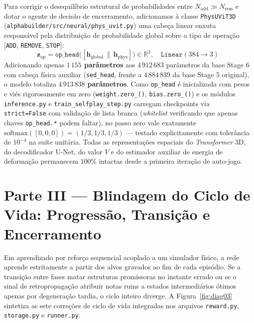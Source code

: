 \documentclass[11pt,a4paper]{article}
\renewcommand{\sectionmark}[1]{\markboth{#1}{}}
\begin{document}
Para corrigir o desequilíbrio estrutural de probabilidades entre $N_{\mathrm{add}} \gg N_{\mathrm{rem}}$ e dotar o agente de decisão de encerramento, adicionamos à classe \texttt{PhysUViT3D} (\texttt{alphabuilder/\allowbreak{}src/\allowbreak{}neural/\allowbreak{}phys\_uvit.py}) uma cabeça linear enxuta responsável pela distribuição de probabilidade global sobre o tipo de operação [\texttt{ADD}, \texttt{REMOVE}, \texttt{STOP}]:
\begin{equation}
  \mathbf{z}_{\mathrm{op}} = \texttt{op\_head}\big([\mathbf{h}_{\mathrm{global}} \,\|\, \mathbf{h}_{\mathrm{phys}}]\big) \in \mathbb{R}^3, \quad \texttt{Linear}(384 \to 3)
\end{equation}
Adicionando apenas \textbf{$1\,155$ parâmetros} aos $4\,912\,683$ parâmetros da base Stage 6 com cabeça física auxiliar (\texttt{sed\_head}, frente a $4\,884\,839$ da base Stage 5 original), o modelo totaliza \textbf{$4\,913\,838$ parâmetros}. Como \texttt{op\_head} é inicializada com pesos e viés rigorosamente em zero (\texttt{weight.zero\_()}, \texttt{bias.zero\_()}) e os módulos \texttt{inference.py} e \texttt{train\_selfplay\_step.py} carregam checkpoints via \texttt{strict=False} com validação de lista branca (\textit{whitelist} verificando que apenas chaves \texttt{op\_head.*} podem faltar), no passo zero vale exatamente $\mathrm{softmax}([0,0,0]) = (1/3, 1/3, 1/3)$ — testado explicitamente com tolerância de $10^{-4}$ na suíte unitária. Todas as representações espaciais do \textit{Transformer} 3D, do decodificador U-Net, do valor $V$ e do estimador auxiliar de energia de deformação permanecem $100\%$ intactas desde a primeira iteração de auto-jogo.

\section{Parte III --- Blindagem do Ciclo de Vida: Progressão, Transição e Encerramento}
\sectionmark{Parte III --- Blindagem do Ciclo de Vida}

Em aprendizado por reforço sequencial acoplado a um simulador físico, a rede aprende estritamente a partir dos alvos gravados ao fim de cada episódio. Se a transição entre fases matar estruturas promissoras no instante errado ou se o sinal de retropropagação atribuir notas ruins a estados intermediários ótimos apenas por degeneração tardia, o ciclo inteiro diverge. A Figura~\ref{fig:diag03} sintetiza as sete correções de ciclo de vida integradas nos arquivos \texttt{reward.py}, \texttt{storage.py} e \texttt{runner.py}.
\end{document}
